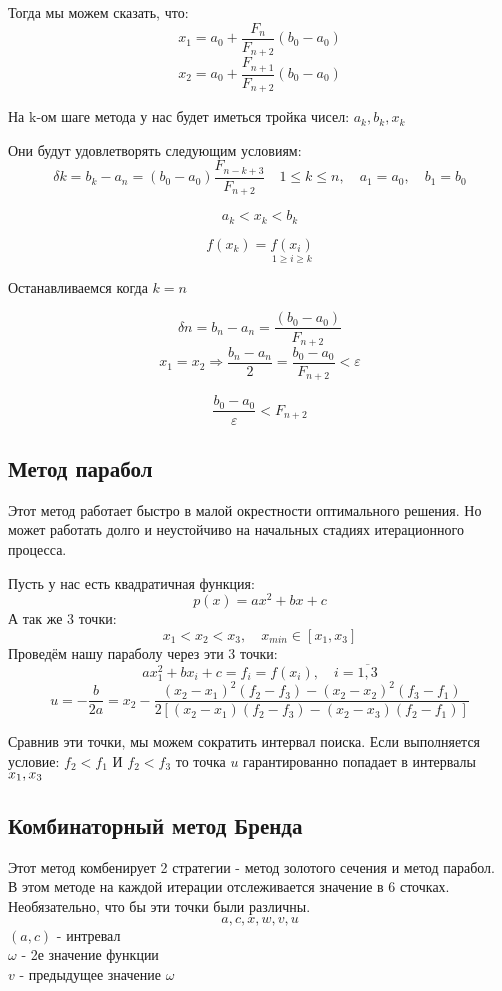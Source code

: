 \documentclass[fleqn]{article}
\begin{document}
Тогда мы можем сказать, что:\\

$$x_1=a_0+\frac{F_n}{F_{n+2}}(b_0-a_0)$$
$$x_2=a_0+\frac{F_{n+1}}{F_{n+2}}(b_0-a_0)$$

На k-ом шаге метода у нас будет иметься тройка чисел: $a_k, b_k, x_k$

Они будут удовлетворять следующим условиям:
$$\delta k = b_k - a_n = (b_0-a_0)\frac{F_{n-k+3}}{F_{n+2}} \quad 1 \leq k \leq n,\quad a_1 = a_0,\quad b_1=b_0$$

$$a_k < x_k < b_k$$

$$f(x_k)=\underset{1 \geq i \geq k}{f(x_i)}$$

Останавливаемся когда $k=n$

$$\delta n = b_n - a_n = \frac{(b_0-a_0)}{F_{n+2}}$$
$$x_1 = x_2 \Rightarrow \frac{b_n - a_n}{2} = \frac{b_0-a_0}{F_{n+2}}<\varepsilon$$

$$\frac{b_0-a_0}{\varepsilon}<F_{n+2}$$

\subsection{Метод парабол}
Этот метод работает быстро в малой окрестности оптимального решения. Но может работать долго и неустойчиво на начальных стадиях итерационного процесса.

Пусть у нас есть квадратичная функция:
$$p(x)=ax^2+bx+c$$
А так же 3 точки:
$$x_1 < x_2 < x_3,\quad x_{min}\in[x_1,x_3]$$
Проведём нашу параболу через эти 3 точки:
$$ax^2_1+bx_i+c=f_i=f(x_i),\quad i=\overline{1,3}$$
$$u=-\frac{b}{2a}=x_2-\frac{(x_2-x_1)^2(f_2-f_3)-(x_2-x_2)^2(f_3-f_1)}{2[(x_2-x_1)(f_2-f_3)-(x_2-x_3)(f_2-f_1)]}$$

Сравнив эти точки, мы можем сократить интервал поиска. Если выполняется условие: $f_2<f_1$ И $f_2<f_3$ то точка $u$ гарантированно попадает в интервалы $x_1,\space x_3$

\subsection{Комбинаторный метод Бренда}
Этот метод комбенирует 2 стратегии - метод золотого сечения и метод парабол.\\

В этом методе на каждой итерации отслеживается значение в 6 сточках. Необязательно, что бы эти точки были различны.
$$a, c, x, w, v, u$$
$(a,c)$ - интревал\\
$\omega$ - 2е значение функции\\
$v$ - предыдущее значение $\omega$\\
\end{document}
